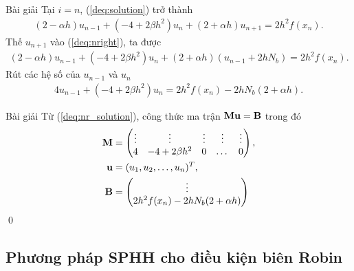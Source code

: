 \documentclass[9pt]{beamer}
\numberwithin{equation}{section}
\begin{document}
\begin{frame}
\begin{exampleblock}{Bài giải}
    Tại $i = n$, (\ref{deq:solution}) trở thành
    \begin{align}
        (2 - \alpha h) u_{n-1} + (-4 + 2\beta h^2) u_n + (2 + \alpha h) u_{n+1} = 2h^2 f(x_n). \label{deq:nright}
    \end{align}
    Thế $u_{n+1}$ vào (\ref{deq:nright}), ta được
    \begin{align*}
        (2 - \alpha h) u_{n-1} + (-4 + 2\beta h^2) u_n + (2 + \alpha h) (u_{n-1} + 2h N_b) = 2h^2 f(x_n).
    \end{align*}
    Rút các hệ số của $u_{n-1}$ và $u_n$
    \begin{align}
        4 u_{n-1} + (-4 + 2\beta h^2) u_n = 2h^2 f(x_n) - 2h N_b (2 + \alpha h). \label{deq:nr_solution}
    \end{align}
\end{exampleblock}
\end{frame}

\begin{frame}
\begin{exampleblock}{Bài giải}
    Từ (\ref{deq:nr_solution}), công thức ma trận ${\bf M} {\bf u} = {\bf B}$ trong đó
    \begin{align*}
        {\bf M} &= \begin{pmatrix}
            \vdots & \vdots & \vdots & \vdots & \vdots \\
            4 & -4 + 2\beta h^2 & 0 & \dots & 0
        \end{pmatrix}, \\
        {\bf u} &= (u_1, u_2, \dots, u_n)^T, \\
        {\bf B} &= \begin{pmatrix}
            \vdots \\
            2h^2 f(x_n) - 2h N_b (2 + \alpha h)
        \end{pmatrix}
    \end{align*} \hfill \qed
\end{exampleblock}
\end{frame}

\subsection{Phương pháp SPHH cho điều kiện biên Robin}
\end{document}
